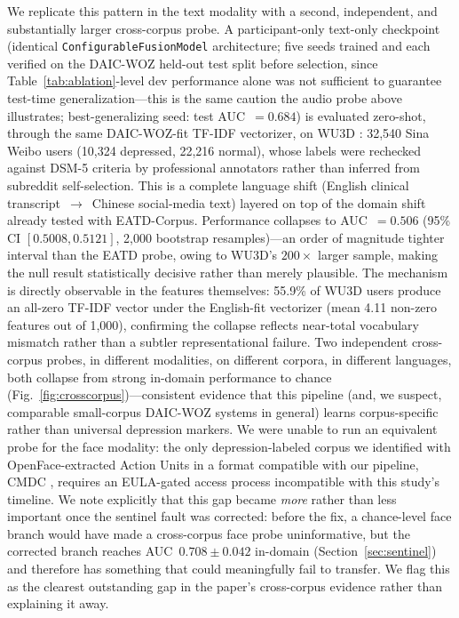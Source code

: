 \documentclass[journal]{IEEEtran}
\begin{document}
We replicate this pattern in the text modality with a second,
independent, and substantially larger cross-corpus probe. A
participant-only text-only checkpoint (identical
\texttt{ConfigurableFusionModel} architecture; five seeds trained and
each verified on the DAIC-WOZ held-out test split before selection,
since Table~\ref{tab:ablation}-level dev performance alone was not
sufficient to guarantee test-time generalization---this is the same
caution the audio probe above illustrates; best-generalizing seed:
test AUC~$=0.684$) is evaluated zero-shot, through the same
DAIC-WOZ-fit TF-IDF vectorizer, on WU3D \cite{wang2020wu3d}: 32,540
Sina Weibo users (10,324 depressed, 22,216 normal), whose labels were
rechecked against DSM-5 criteria by professional annotators rather
than inferred from subreddit self-selection. This is a complete
language shift (English clinical transcript~$\to$~Chinese
social-media text) layered on top of the domain shift already tested
with EATD-Corpus. Performance collapses to AUC~$=0.506$ (95\% CI
$[0.5008, 0.5121]$, 2,000 bootstrap resamples)---an order of
magnitude tighter interval than the EATD probe, owing to WU3D's
$200\times$ larger sample, making the null result statistically
decisive rather than merely plausible. The mechanism is directly
observable in the features themselves: 55.9\% of WU3D users produce
an all-zero TF-IDF vector under the English-fit vectorizer (mean 4.11
non-zero features out of 1,000), confirming the collapse reflects
near-total vocabulary mismatch rather than a subtler representational
failure. Two independent cross-corpus probes, in different
modalities, on different corpora, in different languages, both
collapse from strong in-domain performance to chance
(Fig.~\ref{fig:crosscorpus})---consistent
evidence that this pipeline (and, we suspect, comparable
small-corpus DAIC-WOZ systems in general) learns corpus-specific
rather than universal depression markers. We were unable to run an
equivalent probe for the face modality: the only depression-labeled
corpus we identified with OpenFace-extracted Action Units in a format
compatible with our pipeline, CMDC \cite{zou2023cmdc}, requires an
EULA-gated access process incompatible with this study's timeline. We
note explicitly that this gap became \emph{more} rather than less
important once the sentinel fault was corrected: before the fix, a
chance-level face branch would have made a cross-corpus face probe
uninformative, but the corrected branch reaches AUC~$0.708\pm0.042$
in-domain (Section~\ref{sec:sentinel}) and therefore has something that
could meaningfully fail to transfer. We flag this as the clearest
outstanding gap in the paper's cross-corpus evidence rather than
explaining it away.
\end{document}
